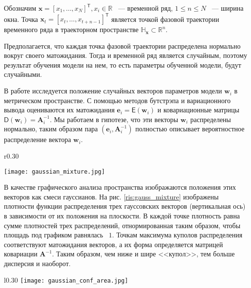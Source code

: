 \documentclass[12pt, twoside]{article}
\begin{document}

Обозначим $\mathbf{x} = [x_1, \dots, x_N]^{\mathsf{T}}, x_i \in \mathbb{R}$ ~--- временной ряд, $1 \le n \le N$ ~--- ширина окна. Точка $\mathbf{x}_t = [x_t, \dots, x_{t + n - 1}]^{\mathsf{T}}$ является точкой фазовой траектории временного ряда в траекторном пространстве $\mathbb{H}_{\mathbf{x}} \subset \mathbb{R}^n$. 

Предполагается, что каждая точка фазовой траектории распределена нормально вокруг своего матожидания. Тогда и временной ряд является случайным, поэтому результат обучения модели на нем, то есть параметры обученной модели, будут случайными.


В работе исследуется положение случайных векторов параметров модели $\mathbf{w}_i$ в метрическом пространстве. С помощью методов бутстрэпа и вариационного вывода \citep{hastie2009elements} оцениваются их матожидания $\mathbf{e}_i=\mathsf{E}(\mathbf{w}_i)$ и ковариационные матрицы $\mathsf{D}(\mathbf{w}_i) = \mathbf{A}^{-1}_i$. Мы работаем в гипотезе, что эти векторы $\mathbf{w}_i$ распределены нормально, таким образом пара $(\mathbf{e}_i, \mathbf{A}^{-1}_i)$ полностью описывает вероятностное распределение вектора $\mathbf{w}_i$.

\begin{wrapfigure}{r}{0.30\textwidth}

\texttt{[image: gaussian\_mixture.jpg]}
\caption{Смесь гауссианов трех 2-х мерных векторов.}
\label{ris:gauss_mixture}
\end{wrapfigure}


В качестве графического анализа пространства изображаются положения этих векторов как смеси гауссианов. На рис. \ref{ris:gauss_mixture} изображены плотности функции распределения трех гауссовских векторов (вертикальная ось) в зависимости от их положения на плоскости. В каждой точке плотность равна сумме плотностей трех распределений, отнормированная таким образом, чтобы площадь под графиком равнялась ~$1$. Точкам максимума куполов распределения соответствуют матожидания векторов, а их форма определяется матрицей ковариации $\mathbf{A}^{-1}$. Таким образом, чем ниже и шире <<купол>>, тем больше дисперсия и наоборот.

\begin{wrapfigure}{l}{0.30\textwidth}
\texttt{[image: gaussian\_conf\_area.jpg]}
\caption{Доверительные области 3-х мерных векторов.}
\label{ris:gauss_conf_area}
\end{wrapfigure}
\end{document}
